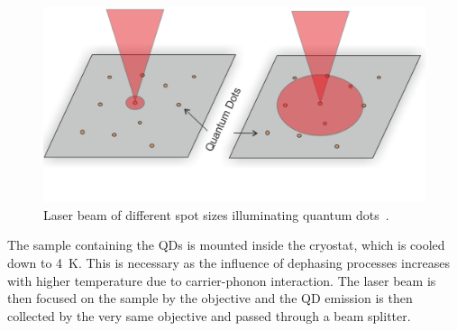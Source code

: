 \begin{figure}[H]
	\centering
	\includegraphics[width=0.7\linewidth]{figures/setup/micro-pl}
	\caption{Laser beam of different spot sizes illuminating quantum dots~\cite{reindl_characterisation_2014}.}
	\label{fig:micro-pl}
\end{figure}

The sample containing the \acp{QD} is mounted inside the cryostat, which is cooled down to \SI{4}{\kelvin}.
This is necessary as the influence of dephasing processes increases with higher temperature due to carrier-phonon interaction.
The laser beam is then focused on the sample by the objective and the \ac{QD} emission is then collected by the very same objective and passed through a beam splitter.
